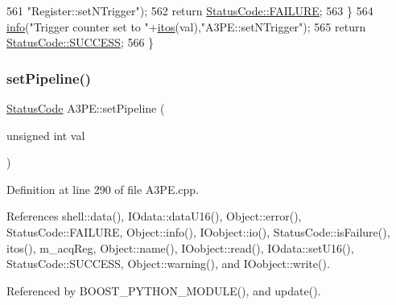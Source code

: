 \begin{DoxyCode}
561         \textcolor{stringliteral}{"Register::setNTrigger"});
562     \textcolor{keywordflow}{return} \hyperlink{classStatusCode_a6f565cbeadc76d14c72f047e5e85eb4ba3da73d4c469762eb9d3c960368252b26}{StatusCode::FAILURE};
563   \}
564   \hyperlink{classObject_a644fd329ea4cb85f54fa6846484b84a8}{info}(\textcolor{stringliteral}{"Trigger counter set to "}+\hyperlink{Tools_8h_af330027dbdafb9a30768b3613c553e60}{itos}(val),\textcolor{stringliteral}{"A3PE::setNTrigger"});
565   \textcolor{keywordflow}{return} \hyperlink{classStatusCode_a6f565cbeadc76d14c72f047e5e85eb4badd0da38d3ba0d922efd1f4619bc37ad8}{StatusCode::SUCCESS};
566 \}
\end{DoxyCode}
\mbox{\label{classA3PE_a5b3840fc8edd14427ac9fb4def3171d3}} 
\subsubsection{\texorpdfstring{set\+Pipeline()}{setPipeline()}}
{\footnotesize\ttfamily \hyperlink{classStatusCode}{Status\+Code} A3\+P\+E\+::set\+Pipeline (\begin{DoxyParamCaption}\item[{unsigned int}]{val }\end{DoxyParamCaption})}



Definition at line 290 of file A3\+P\+E.\+cpp.



References shell\+::data(), I\+Odata\+::data\+U16(), Object\+::error(), Status\+Code\+::\+F\+A\+I\+L\+U\+RE, Object\+::info(), I\+Oobject\+::io(), Status\+Code\+::is\+Failure(), itos(), m\+\_\+acq\+Reg, Object\+::name(), I\+Oobject\+::read(), I\+Odata\+::set\+U16(), Status\+Code\+::\+S\+U\+C\+C\+E\+SS, Object\+::warning(), and I\+Oobject\+::write().



Referenced by B\+O\+O\+S\+T\+\_\+\+P\+Y\+T\+H\+O\+N\+\_\+\+M\+O\+D\+U\+L\+E(), and update().


